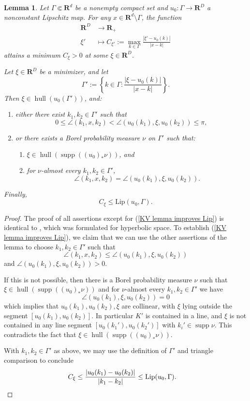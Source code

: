 \documentclass[reqno,11pt]{amsart}
\newcommand{\RR}{\mathbf{R}}
\DeclareMathOperator{\supp}{supp}
\DeclareMathOperator{\hull}{hull}
\newcommand{\Lip}{\mathrm{Lip}}
\newtheorem{lemma}[theorem]{Lemma}
\theoremstyle{definition}
\numberwithin{equation}{section}
\begin{document}
\begin{lemma}\label{KV lemma}
Let $\Gamma \Subset \RR^d$ be a nonempty compact set and $u_0: \Gamma \to \RR^D$ a nonconstant Lipschitz map.
For any $x \in \RR^d \setminus \Gamma$, the function 
\begin{align*} 
\RR^D &\to \RR_+ \\
\xi' &\mapsto C_{\xi'} := \max_{k \in \Gamma} \frac{|\xi' - u_0(k)|}{|x - k|}
\end{align*}
attains a minimum $C_\xi > 0$ at some $\xi \in \RR^D$.

Let $\xi \in \RR^D$ be a minimizer, and let
$$\Gamma' := \left\{k \in \Gamma: \frac{|\xi - u_0(k)|}{|x - k|}\right\}.$$
Then $\xi \in \hull(u_0(\Gamma'))$, and:
\begin{enumerate}
\item either there exist $k_1, k_2 \in \Gamma'$ such that 
$$0 \leq \angle (k_1, x, k_2) < \angle (u_0(k_1), \xi, u_0(k_2)) \leq \pi,$$
\item or there exists a Borel probability measure $\nu$ on $\Gamma'$ such that:
\begin{enumerate}
\item $\xi \in \hull(\supp((u_0)_* \nu))$, and
\item for $\nu$-almost every $k_1, k_2 \in \Gamma'$,
$$\angle (k_1, x, k_2) = \angle (u_0(k_1), \xi, u_0(k_2)).$$
\end{enumerate}
\end{enumerate}
Finally, 
\begin{equation}\label{KV lemma improves Lip}
C_\xi \leq \Lip(u_0, \Gamma).
\end{equation}
\end{lemma}
\begin{proof}
The proof of all assertions except for (\ref{KV lemma improves Lip}) is identical to \cite[Lemma 3.2]{Kassel17}, which was formulated for hyperbolic space.
To establish (\ref{KV lemma improves Lip}), we claim that we can use the other assertions of the lemma to choose $k_1, k_2 \in \Gamma'$ such that 
$$\angle (k_1, x, k_2) \leq \angle (u_0(k_1), \xi, u_0(k_2))$$
and $\angle (u_0(k_1), \xi, u_0(k_2)) > 0$.

If this is not possible, then there is a Borel probability measure $\nu$ such that $\xi \in \hull(\supp((u_0)_* \nu))$ and for $\nu$-almost every $k_1, k_2 \in \Gamma'$ we have
$$\angle (u_0(k_1), \xi, u_0(k_2)) = 0$$
which implies that $u_0(k_1), u_0(k_2), \xi$ are collinear, with $\xi$ lying outside the segment $[u_0(k_1), u_0(k_2)]$.
In particular $K'$ is contained in a line, and $\xi$ is not contained in any line segment $[u_0(k_1'), u_0(k_2')]$ with $k_i' \in \supp \nu$.
This contradicts the fact that $\xi \in \hull(\supp((u_0)_* \nu))$.

With $k_1, k_2 \in \Gamma'$ as above, we may use the definition of $\Gamma'$ and triangle comparison to conclude
\begin{align*}
C_\xi &\leq \frac{|u_0(k_1) - u_0(k_2)|}{|k_1 - k_2|} \leq \Lip(u_0, \Gamma). \qedhere 
\end{align*}
\end{proof}
\end{document}

